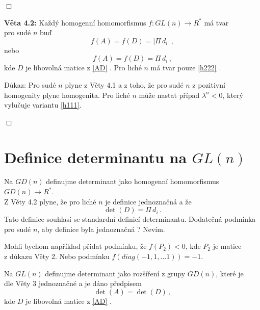 \documentclass[12pt]{article}
\begin{document}
$\Box$

\vspace{3mm}
\textbf{Věta 4.2:} Každý homogenní homomorfismus $f: GL(n) \rightarrow R^*$ má tvar\\  pro sudé $n$ buď
\begin{equation}
\label{h111}
f(A) = f(D) = |\Pi\, d_i|\, ,
\end{equation}
nebo
\begin{equation}
\label{h222}
f(A) = f(D) = \Pi\, d_i\, ,
\end{equation}
kde $D$ je libovolná matice z \ref{AD} . 
Pro liché $n$ má tvar pouze \ref{h222} .

\vspace{2mm}
Důkaz: 
\vspace{1mm}
Pro sudé $n$ plyne z Věty 4.1 a z toho, že pro sudé $n$ z pozitivní homogenity plyne homogenita. 
Pro liché $n$ může nastat případ $\lambda^n < 0$, který vylučuje variantu \ref{h111}. 

$\Box$
\vspace{4mm}


{\section{Definice determinantu na $GL(n)$ }} 

\vspace{4mm}

Na $GD(n)$ definujme determinant jako homogenní homomorfismus $GD(n) \rightarrow R^*$.\\
 Z Věty 4.2 plyne, že pro liché $n$ je definice jednoznačná a že 
\begin{equation}
\label{detD}
\det(D) = \Pi\, d_i \, .
\end{equation}
Tato definice souhlasí se standardní definicí determinantu.
\vspace{1mm}
Dodatečná podmínka pro sudé $n$, aby definice byla jednoznačná ?  Nevím.

Mohli bychom například přidat podmínku, že $f(P_2) < 0$, kde $P_2$ je matice\\
 z důkazu Věty 2. Nebo podmínku $f(diag(-1, 1, \dots 1)) = -1$.


\vspace{5mm}
Na $GL(n)$ definujme determinant jako rozšíření z grupy $GD(n)$, které je \\
dle Věty 3 jednoznačné a je dáno předpisem
\begin{equation}
\label{detA}
\det(A) = \det(D) \, ,
\end{equation}
kde $D$ je libovolná matice z \ref{AD} . 
\vspace{4mm}
\end{document}
